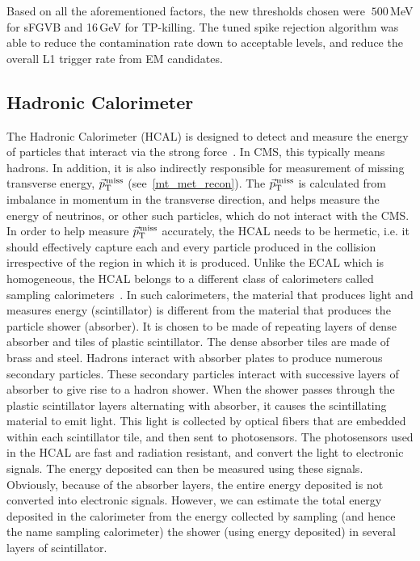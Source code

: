 Based on all the aforementioned factors, the new thresholds chosen were $~500\,$MeV for sFGVB and 16\,GeV for TP-killing. The tuned spike rejection algorithm was able to reduce the contamination rate down to acceptable levels, and reduce the overall L1 trigger rate from EM candidates.  



\subsection{Hadronic Calorimeter}
\label{Hcal}
The Hadronic Calorimeter (HCAL) is designed to detect and measure the energy of particles that interact via the strong force~\cite{cms_exp_ref}. In CMS, this typically means hadrons. In addition, it is also indirectly responsible for measurement of missing transverse energy, ${\vec p}_{\mathrm{T}}^{\kern1pt\text{miss}}$ (see~\ref{mt_met_recon}). The ${\vec p}_{\mathrm{T}}^{\kern1pt\text{miss}}$ is calculated from imbalance in momentum in the transverse direction, and helps measure the energy of neutrinos, or other such particles, which do not interact with the CMS. In order to help measure ${\vec p}_{\mathrm{T}}^{\kern1pt\text{miss}}$ accurately, the HCAL needs to be hermetic, i.e. it should effectively capture each and every particle produced in the collision irrespective of the region in which it is produced. Unlike the ECAL which is homogeneous, the HCAL belongs to a different class of calorimeters called sampling calorimeters~\cite{hcal1}. In such calorimeters, the  material that produces light and measures energy (scintillator) is different from the material that produces the particle shower (absorber). It is chosen to be made of repeating layers of dense absorber and tiles of plastic scintillator. The dense absorber tiles are made of brass and steel. Hadrons interact with absorber plates to produce numerous secondary particles. These secondary particles interact with successive layers of absorber to give rise to a hadron shower. When the shower passes through the plastic scintillator layers alternating with absorber, it causes the scintillating material to emit light. This light is collected by optical fibers that are embedded within each scintillator tile, and then sent to photosensors. The photosensors used in the HCAL are fast and radiation resistant, and convert the light to electronic signals. The energy deposited can then be measured using these signals. Obviously, because of the absorber layers, the entire energy deposited is not converted into electronic signals. However, we can estimate the total energy deposited in the calorimeter from the energy collected by sampling (and hence the name sampling calorimeter) the shower (using  energy deposited) in several layers of scintillator.

